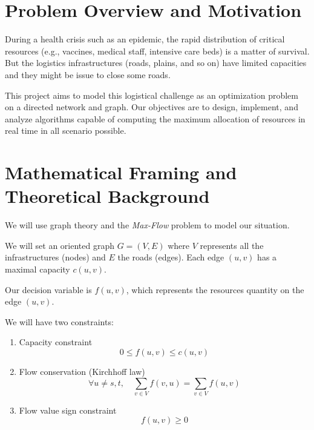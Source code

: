 \documentclass[12pt, openany]{article}
\begin{document}
\clearpage %


\tableofcontents


\section{Problem Overview and Motivation}

During a health crisis such as an epidemic, the rapid distribution of critical resources (e.g., vaccines, medical staff, intensive care beds) is a matter of survival. But the logistics infrastructures (roads, plains, and so on) have limited capacities and they might be issue to close some roads.

This project aims to model this logistical challenge as an optimization problem on a directed network and graph. Our objectives are to design, implement, and analyze algorithms capable of computing the maximum allocation of resources in real time in all scenario possible.

\section{Mathematical Framing and Theoretical Background}

We will use graph theory and the \textit{Max-Flow} problem to model our situation.

We will set an oriented graph $G=(V,E)$ where $V$ represents all the infrastructures (nodes) and $E$ the roads (edges). Each edge $(u,v)$ has a maximal capacity $c(u,v)$.

Our decision variable is $f(u,v)$, which represents the resources quantity on the edge $(u,v)$.

We will have two constraints:

\begin{enumerate}
    \item Capacity constraint
    \begin{equation}
        0 \leq f(u,v) \leq c(u,v)
    \end{equation}
    \item Flow conservation (Kirchhoff law)
    \begin{equation}
        \forall u \neq s,t, \quad \sum_{v \in V} f(v,u) = \sum_{v \in V} f(u,v)
    \end{equation}
    \item Flow value sign constraint
    \[
        f(u, v) \geq 0
    \]
\end{enumerate}
\end{document}
